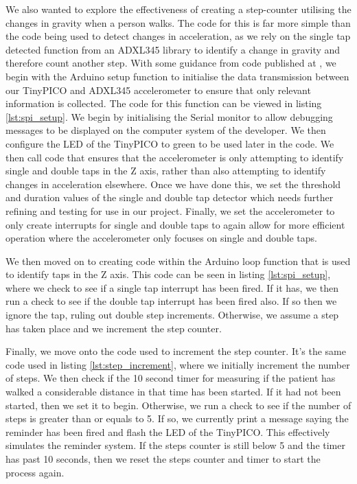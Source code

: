 {We also wanted to explore the effectiveness of creating a step-counter utilising the changes in gravity when a person walks. The code for this is far more simple than the code being used to detect changes in acceleration, as we rely on the single tap detected function from an ADXL345 library to identify a change in gravity and therefore count another step. With some guidance from code published at \cite{tiennotg}, we begin with the Arduino setup function to initialise the data transmission between our TinyPICO and ADXL345 accelerometer to ensure that only relevant information is collected. The code for this function can be viewed in listing \ref{lst:spi_setup}. We begin by initialising the Serial monitor to allow debugging messages to be displayed on the computer system of the developer. We then configure the LED of the TinyPICO to green to be used later in the code. We then call code that ensures that the accelerometer is only attempting to identify single and double taps in the Z axis, rather than also attempting to identify changes in acceleration elsewhere. Once we have done this, we set the threshold and duration values of the single and double tap detector which needs further refining and testing for use in our project. Finally, we set the accelerometer to only create interrupts for single and double taps to again allow for more efficient operation where the accelerometer only focuses on single and double taps.



We then moved on to creating code within the Arduino loop function that is used to identify taps in the Z axis. This code can be seen in listing \ref{lst:spi_setup}, where we check to see if a single tap interrupt has been fired. If it has, we then run a check to see if the double tap interrupt has been fired also. If so then we ignore the tap, ruling out double step increments. Otherwise, we assume a step has taken place and we increment the step counter. 



Finally, we move onto the code used to increment the step counter. It's the same code used in listing \ref{lst:step_increment}, where we initially increment the number of steps. We then check if the 10 second timer for measuring if the patient has walked a considerable distance in that time has been started. If it had not been started, then we set it to begin. Otherwise, we run a check to see if the number of steps is greater than or equals to 5. If so, we currently print a message saying the reminder has been fired and flash the LED of the TinyPICO. This effectively simulates the reminder system. If the steps counter is still below 5 and the timer has past 10 seconds, then we reset the steps counter and timer to start the process again. 

}